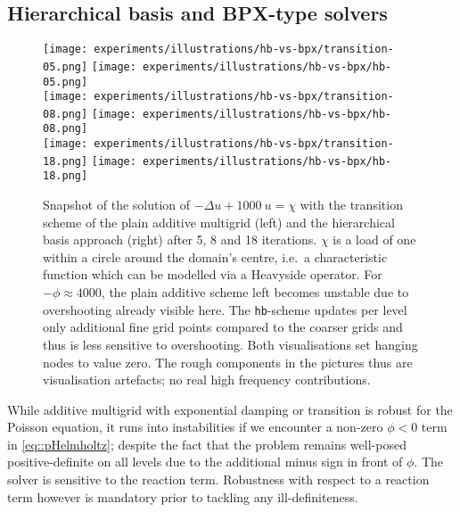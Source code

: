 \subsection{Hierarchical basis and BPX-type solvers}


\begin{figure}[htb]
  \begin{center} 
    \texttt{[image: experiments/illustrations/hb-vs-bpx/transition-05.png]}
    \texttt{[image: experiments/illustrations/hb-vs-bpx/hb-05.png]}
    \\
    \texttt{[image: experiments/illustrations/hb-vs-bpx/transition-08.png]}
    \texttt{[image: experiments/illustrations/hb-vs-bpx/hb-08.png]}
    \\
    \texttt{[image: experiments/illustrations/hb-vs-bpx/transition-18.png]}
    \texttt{[image: experiments/illustrations/hb-vs-bpx/hb-18.png]}
  \end{center}
  \vspace{-0.4cm}
  \caption{
    Snapshot of the solution of $-\Delta u + 1000\ u = \chi$ with the transition
    scheme of the plain additive multigrid (left) and the hierarchical basis
    approach (right) after 5, 8 and 18 iterations. $\chi$ is a load of one within a circle around the
    domain's centre, i.e.~a characteristic function which can be modelled via a
    Heavyside operator.
    For $-\phi \approx 4000$, the plain additive scheme
    left becomes unstable due to overshooting already visible here.
    The \texttt{hb}-scheme updates per level only additional fine grid points
    compared to the coarser grids and thus is less sensitive to overshooting. 
    Both visualisations set hanging nodes to value zero. 
    The rough components in the pictures thus are visualisation artefacts; no
    real high frequency contributions.
   \label{fig::add-vs-hb}
  }
\end{figure}


While additive multigrid with exponential damping or transition is robust for
the Poisson equation, it runs into instabilities if we encounter a non-zero
$\phi<0$ term in \eqref{eq::pHelmholtz}; despite the fact that the problem
remains well-posed positive-definite on all levels due to the additional minus sign in front of $\phi$.
The solver is sensitive to the reaction term.
Robustness with respect to a reaction term however is mandatory prior to
tackling any ill-definiteness. 

